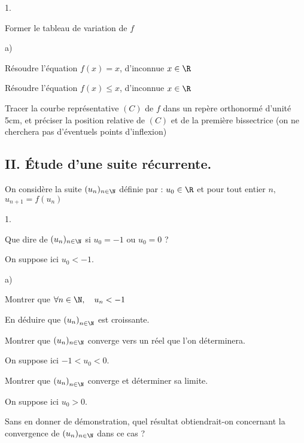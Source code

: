 \documentclass[11pt]{article}%
\begin{document}
\begin{noliste}{1.}
 \setlength{\itemsep}{4mm}
\item Former le tableau de variation de $f$

\item 

\begin{noliste}{a)}
 \setlength{\itemsep}{2mm}
\item Résoudre l'équation $f\left( x\right) = x$, d'inconnue $x\in \R$

\item Résoudre l'équation $f\left( x\right) \leq x$, d'inconnue $x\in 
\R$
\end{noliste}

\item Tracer la courbe représentative $\left( C\right) $ de $f$ dans un
repère orthonormé d'unité 5cm, et préciser la position relative de
$\left(
C\right) $ et de la première bissectrice (on ne cherchera pas
d'éventuels
points d'inflexion)
\end{noliste}

\subsection*{II. Étude d'une suite récurrente.}

On considère la suite $(u_{n})_{n\in \N}$ définie par : $u_{0}\in 
\R$ et pour tout entier $n,$ $u_{n + 1} = f\left( u_{n}\right) $

\begin{noliste}{1.}
 \setlength{\itemsep}{4mm}
\item Que dire de $(u_{n})_{n\in \N}$ si $u_{0} = -1$ ou $u_{0} = 0$ ?

\item On suppose ici $u_{0}<-1$.

\begin{noliste}{a)}
 \setlength{\itemsep}{2mm}
\item Montrer que $\forall n\in \N,\quad u_{n}<-1$

\item En déduire que $\left( u_{n}\right)_{n\in \N}$ est croissante.

\item Montrer que $(u_{n})_{n\in \N}$ converge vers un réel que l'on
déterminera.
\end{noliste}

\item On suppose ici $-1<u_{0}<0$.

Montrer que $\left( u_{n}\right)_{n\in \N}$ converge et déterminer
sa limite.

\item On suppose ici $u_{0}>0$.

Sans en donner de démonstration, quel résultat obtiendrait-on
concernant la
convergence de $(u_{n})_{n\in \N}$ dans ce cas ?
\end{noliste}
\end{document}
